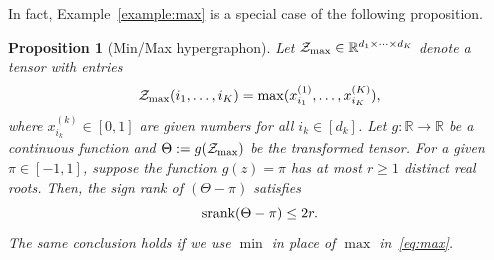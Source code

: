 \documentclass[11pt]{article}
\theoremstyle{plain}
\newtheorem{prop}{Proposition}[section]
\theoremstyle{definition}
\def\srank{\textup{srank}}
\begin{document}
In fact, Example~\ref{example:max} is a special case of the following proposition. 

\begin{prop}[Min/Max hypergraphon] Let $\mathcal{Z}_{\max}\in\mathbb{R}^{d_1\times \cdots \times d_K}$ denote a tensor with entries 
\begin{equation}\label{eq:max}
\mathcal{Z}_{\max}(i_1,\ldots,i_K)=\max(x^{(1)}_{i_1},\ldots,x^{(K)}_{i_K}),
\end{equation}
where $x^{(k)}_{i_k}\in[0,1]$ are given numbers for all $i_k\in[d_k]$. Let $g\colon \mathbb{R}\to \mathbb{R}$ be a continuous function and $\Theta:=g(\mathcal{Z}_{\max})$ be the transformed tensor. For a given $\pi\in[-1,1]$, suppose the function $g(z)=\pi$ has at most $r\geq 1$ distinct real roots. Then, the sign rank of $(\Theta-\pi)$ satisfies
\[
\srank(\Theta-\pi)\leq 2r.
\]
The same conclusion holds if we use $\min$ in place of $\max$ in~\eqref{eq:max}. 
\end{prop}
\end{document}
